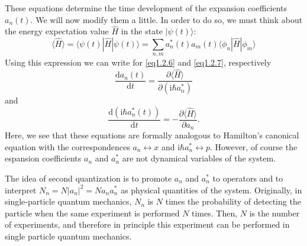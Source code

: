 \documentclass[twoside,11pt]{report}
\def\be{\begin{equation}}
\def\ee{\end{equation}}
\def\ii{\text{i}}
\def\dd{\text{d}}
\def\dt{\text{d}t}
\begin{document}
These equations determine the time development of the expansion coefficients $a_n(t)$. We will now modify them a little. In order to do so, we must think about the energy expectation value $\hat H$ in the state $|\psi(t)\rangle$:
\be
\langle\hat{H}\rangle=\langle\psi(t)|\hat{H}|\psi(t)\rangle=\sum_{n,m}a_n^*(t)a_m(t)\langle\phi_n|\hat{H}|\phi_m\rangle
\ee
Using this expression we can write for \eqref{eq1.2.6} and \eqref{eq1.2.7}, respectively
\be\label{eq1.2.9}
\frac{\dd a_n(t)}{\dt}=\frac{\partial\langle\hat{H}\rangle}{\partial(\ii\hbar a_n^*)}
\ee
and
\be\label{eq1.2.10}
\frac{\dd(\ii\hbar a_n^*(t))}{\dt}=-\frac{\partial\langle\hat H\rangle}{\partial a_n}.
\ee
Here, we see that these equations are formally analogous to Hamilton's canonical equation with the correspondences $a_n\leftrightarrow x$ and $\ii\hbar a_n^*\leftrightarrow p$. However, of course the espansion coefficients $a_n$ and $a_n^*$ are not dynamical variables of the system. 

The idea of second quantization is to promote $a_n$ and $a_n^*$ to operators and to interpret $N_n=N|a_n|^2=Na_na_n^*$ as physical quantities of the system. Originally, in single-particle quantum mechanics, $N_n$ is $N$ times the probability of detecting the particle when the same experiment is performed $N$ times. Then, $N$ is the number of experiments, and therefore in principle this experiment can be performed in single particle quantum mechanics. 
\end{document}
